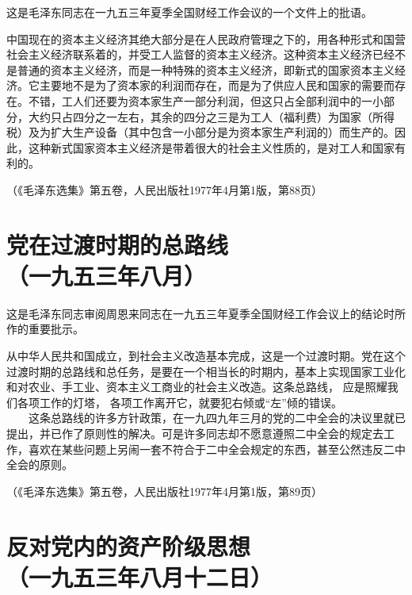 \documentclass[cn,11pt,chinese]{elegantbook}
\def\myformat#1{\hfil\hfil #1}
\begin{document}
\begin{introduction}\item   这是毛泽东同志在一九五三年夏季全国财经工作会议的一个文件上的批语。\end{introduction}
中国现在的资本主义经济其绝大部分是在人民政府管理之下的，用各种形式和国营社会主义经济联系着的，并受工人监督的资本主义经济。这种资本主义经济已经不是普通的资本主义经济，而是一种特殊的资本主义经济，即新式的国家资本主义经济。它主要地不是为了资本家的利润而存在，而是为了供应人民和国家的需要而存在。不错，工人们还要为资本家生产一部分利润，但这只占全部利润中的一小部分，大约只占四分之一左右，其余的四分之三是为工人（福利费）为国家（所得税）及为扩大生产设备（其中包含一小部分是为资本家生产利润的）而生产的。因此，这种新式国家资本主义经济是带着很大的社会主义性质的，是对工人和国家有利的。\\
\begin{flushright}（《毛泽东选集》第五卷，人民出版社1977年4月第1版，第88页）\end{flushright}
\newpage\section*{\myformat{党在过渡时期的总路线}\\\myformat{（一九五三年八月）}}
\begin{introduction}\item  这是毛泽东同志审阅周恩来同志在一九五三年夏季全国财经工作会议上的结论时所作的重要批示。\end{introduction}
从中华人民共和国成立，到社会主义改造基本完成，这是一个过渡时期。党在这个过渡时期的总路线和总任务，是要在一个相当长的时期内，基本上实现国家工业化和对农业、手工业、资本主义工商业的社会主义改造。这条总路线， 应是照耀我们各项工作的灯塔， 各项工作离开它，就要犯右倾或“左”倾的错误。\\
　　这条总路线的许多方针政策，在一九四九年三月的党的二中全会的决议里就已提出，并已作了原则性的解决。可是许多同志却不愿意遵照二中全会的规定去工作，喜欢在某些问题上另闹一套不符合于二中全会规定的东西，甚至公然违反二中全会的原则。\\
\begin{flushright}（《毛泽东选集》第五卷，人民出版社1977年4月第1版，第89页）\end{flushright}
\newpage\section*{\myformat{反对党内的资产阶级思想}\\\myformat{（一九五三年八月十二日）}}
\end{document}
